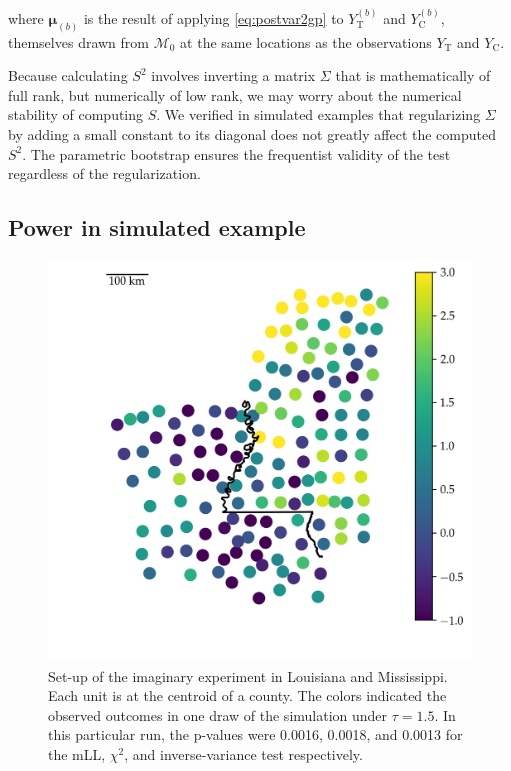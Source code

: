\documentclass[letter]{article}
\makeatletter
\def\maxwidth{\ifdim\Gin@nat@width>\linewidth\linewidth
\else\Gin@nat@width\fi}
\let\Oldincludegraphics\includegraphics
\renewcommand{\includegraphics}[1]{\Oldincludegraphics[width=1.0\maxwidth]{#1}}
\newcommand{\treat}{\mathrm{T}}
\newcommand{\ctrol}{\mathrm{C}}
\newcommand{\muvec}{\mathbold{\mu}}
\newcommand{\modnull}{\mathscr{M}_0}
\makeatother
\begin{document}
where \(\muvec_{(b)}\) is the result of applying \eqref{eq:postvar2gp} to \(Y_\treat^{(b)}\) and \(Y_\ctrol^{(b)}\), themselves drawn from \(\modnull\) at the same locations as the observations \(Y_\treat\) and \(Y_\ctrol\).

Because calculating \(S^2\) involves inverting a matrix \(\Sigma\) that is mathematically of full rank, but numerically of low rank, we may worry about the numerical stability of computing \(S\).
We verified in simulated examples that regularizing \(\Sigma\) by adding a small constant to its diagonal does not greatly affect the computed \(S^2\).
The parametric bootstrap ensures the frequentist validity of the test
regardless of the regularization.
    


    	\subsection{Power in simulated example}\label{power-in-simulated-example}
    


    	\begin{figure}
\centering
\includegraphics{../figures/mississippi_sim.png}
\caption{\label{fig:mississippi_counties}Set-up of the imaginary experiment in Louisiana and Mississippi. Each unit is at the centroid of a county. The colors indicated the observed outcomes in one draw of the simulation under \(\tau=1.5\). In this particular run, the p-values were 0.0016, 0.0018, and 0.0013 for the mLL, \(\chi^2\), and inverse-variance test respectively.}
\end{figure}
    
\end{document}
